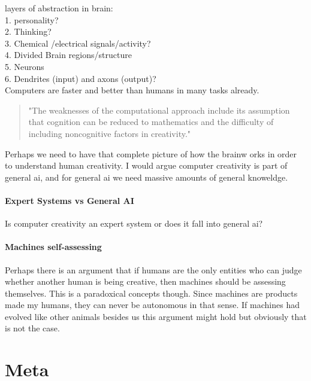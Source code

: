 layers of abstraction in brain:\\
1.	personality?\\
2.	Thinking?\\
3.	Chemical /electrical signals/activity?\\
4.	Divided Brain regions/structure\\
5.	Neurons\\
6.	Dendrites (input) and axons (output)?\\


Computers are faster and better than humans in many tasks already.

\begin{quote}
"The weaknesses of the computational approach include its assumption that cognition can be reduced to mathematics and the difficulty of including noncognitive factors in creativity." \autocite[p.457]{Mayer1999}
\end{quote}


Perhaps we need to have that complete picture of how the brainw orks in order to understand human creativity. I would argue computer creativity is part of general \gls{ai}, and for general \gls{ai} we need massive amounts of general knoweldge.
\paragraph{Expert Systems vs General AI}
Is computer creativity an expert system or does it fall into general \gls{ai}? 

\paragraph{Machines self-assessing}
Perhaps there is an argument that if humans are the only entities who can judge whether another human is being creative, then machines should be assessing themselves. This is a paradoxical concepts though. Since machines are products made my humans, they can never be autonomous in that sense. If machines had evolved like other animals besides us this argument might hold but obviously that is not the case.



\section{Meta}

